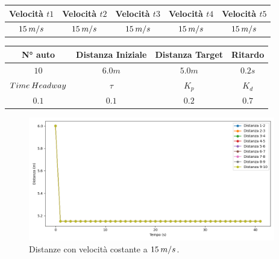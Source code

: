 \begin{table}[h]
    \centering
    \begin{tabular}{|c|c|c|c|c|}
        \hline
        Velocità $t1$ & Velocità $t2$ & Velocità $t3$ &Velocità $t4$ &Velocità $t5$\\
        \hline
            $15\hspace{0.2em}m/s$ & $15\hspace{0.2em}m/s$ & $15\hspace{0.2em}m/s$ & $15\hspace{0.2em}m/s$ & $15\hspace{0.2em}m/s$ \\
        \hline
    \end{tabular}
\end{table}
\begin{table}[h]
    \centering
    \begin{tabular}{|c|c|c|c|}
        \hline
        N° auto & Distanza Iniziale & Distanza Target & Ritardo \\
        \hline
        $10$ & $6.0 m$ & $5.0 m$ & $0.2 s$ \\
        \hline
        $Time\hspace{0.2em}Headway$ & $\tau$ & $K_p$ & $K_d$  \\
        \hline
        $0.1$ & $0.1$ & $0.2$ & $0.7$ \\
        \hline
    \end{tabular}
\end{table}

\begin{figure}[H]
    \includegraphics[width=0.96\textwidth]{images/5-experiment/compost/distance_a.png}
    \caption{Distanze con velocità costante a $15\hspace{0.2em}m/s$.}
    \label{fig:a-compost-distance}
\end{figure}

